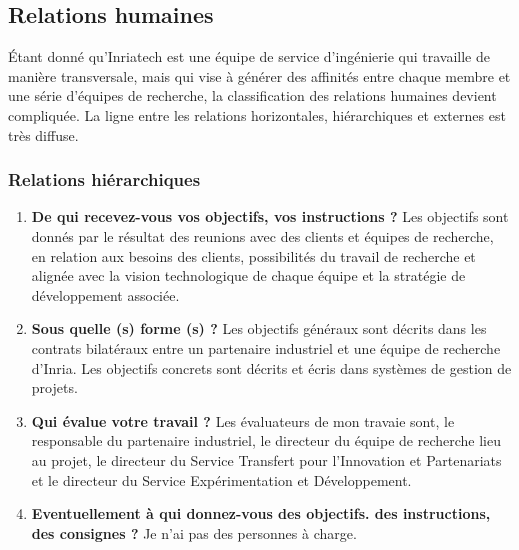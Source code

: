 \documentclass{resume} %
\begin{document}

	\subsection{Relations humaines}
	Étant donné qu'Inriatech est une équipe de service d'ingénierie qui travaille de manière transversale, mais qui vise à générer des affinités entre chaque membre et une série d'équipes de recherche, la classification des relations humaines devient compliquée. La ligne entre les relations horizontales, hiérarchiques et externes est très diffuse.
	
		\subsubsection {Relations hiérarchiques}
		\begin{enumerate}
			\item \textbf{De qui recevez-vous vos objectifs, vos instructions ?}
				Les objectifs sont donnés par le résultat des reunions avec des clients et équipes de recherche, en relation aux besoins des clients, possibilités du travail de recherche et alignée avec la vision technologique de chaque équipe et la stratégie de développement associée.
		\item \textbf{Sous quelle (s) forme (s) ?}
				Les objectifs généraux sont décrits dans les contrats bilatéraux entre un partenaire industriel et une équipe de recherche d'Inria. 
				Les objectifs concrets sont décrits et écris dans systèmes de gestion de projets. 
		\item \textbf{Qui évalue votre travail ?}
				Les évaluateurs de mon travaie sont, le responsable du partenaire industriel, le directeur du équipe de recherche lieu au projet, le directeur du Service Transfert pour l'Innovation et Partenariats et le directeur du Service Expérimentation et Développement. 
		\item  \textbf{Eventuellement à qui donnez-vous des objectifs. des instructions, des consignes ?}
			Je n'ai pas des personnes \`a charge.
		\end{enumerate}
\end{document}
